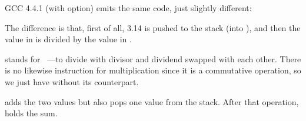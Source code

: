﻿

GCC 4.4.1 (with \Othree option) emits the same code, just slightly different:



The difference is that, first of all, 3.14 is pushed to the stack (into ), and then the value 
in  is divided by the value in .


\FDIVR stands for ~---to divide with divisor and dividend swapped with each other. 
There is no likewise instruction for multiplication since it is 
a commutative operation, so we just have \FMUL without its  counterpart.


\FADDP adds the two values but also pops one value from the stack. 
After that operation,  holds the sum.

